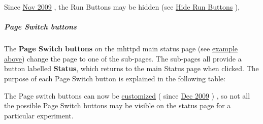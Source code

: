 \label{RC_mhttpd_status_page_features_RC_mhttpd_note1}
\hypertarget{RC_mhttpd_status_page_features_RC_mhttpd_note1}{}
  Since \hyperlink{NDF_ndf_nov_2009}{Nov 2009} , the Run Buttons may be hidden (see \hyperlink{RC_customize_ODB_RC_Experiment_tree_keys}{Hide Run Buttons} ),

\label{RC_mhttpd_status_page_features_idx_mhttpd_buttons_page-switch}
\hypertarget{RC_mhttpd_status_page_features_idx_mhttpd_buttons_page-switch}{}
 \hypertarget{RC_mhttpd_status_page_features_RC_mhttpd_status_Page_buttons}{}\subparagraph{Page Switch buttons}\label{RC_mhttpd_status_page_features_RC_mhttpd_status_Page_buttons}
The {\bfseries Page Switch buttons} on the mhttpd main status page (see \hyperlink{RC_mhttpd_status_page_features_RC_mhttpd_main_status_new}{example above}) change the page to one of the sub-\/pages. The sub-\/pages all provide a button labelled {\bfseries Status}, which returns to the main Status page when clicked. The purpose of each Page Switch button is explained in the following table:

The Page switch buttons can now be \hyperlink{RC_customize_ODB_RC_ODB_Experiment_Tree}{customized} ( since \hyperlink{NDF_ndf_dec_2009}{Dec 2009} ) , so not all the possible Page Switch buttons may be visible on the status page for a particular experiment.

